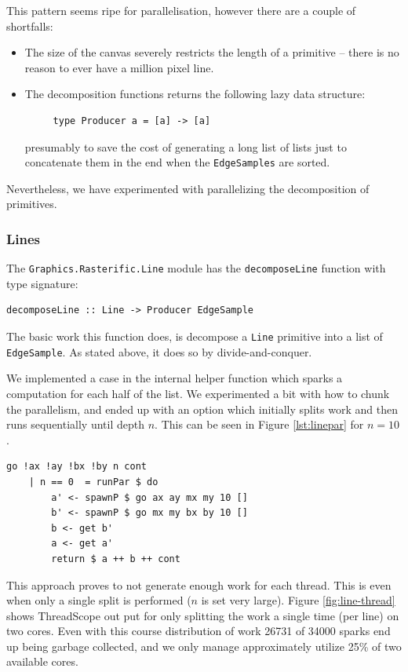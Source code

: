 \documentclass[12pt, a4paper]{article}
\begin{document}
This pattern seems ripe for parallelisation, however there are a couple of shortfalls:
\begin{itemize}
\item The size of the canvas severely restricts the length of a primitive -- there is no reason to ever
   have a million pixel line.
 \item The decomposition functions returns the following lazy data structure:
   \begin{lstlisting}
     type Producer a = [a] -> [a]\end{lstlisting}
   presumably to save the cost of generating a long list of lists just to concatenate them in the end
    when the \texttt{EdgeSamples} are sorted.
  \end{itemize}
  Nevertheless, we have experimented with parallelizing the decomposition of primitives.

\subsubsection{Lines}
The \texttt{Graphics.Rasterific.Line} module has the \texttt{decomposeLine} function with type
signature:
\begin{lstlisting}
decomposeLine :: Line -> Producer EdgeSample\end{lstlisting}
The basic work this function does, is decompose a \texttt{Line} primitive into a list of
\texttt{EdgeSample}. As stated above, it does so by divide-and-conquer.

We implemented a case in the internal helper function which sparks a computation for each half of the list.
We experimented a bit with how to chunk the parallelism, and ended up with an option which initially splits
 work and then runs sequentially until depth $n$. This can be seen in Figure \ref{lst:linepar} for $n=10$.
\begin{lstlisting}[caption={Naively splitting work in two parts every 10 levels of the recursion tree.}, label={lst:linepar}]
    go !ax !ay !bx !by n cont
    | n == 0  = runPar $ do
        a' <- spawnP $ go ax ay mx my 10 []
        b' <- spawnP $ go mx my bx by 10 []
        b <- get b'
        a <- get a'
        return $ a ++ b ++ cont
\end{lstlisting}
This approach proves to not generate enough work for each thread. This is even when only a single split
is performed ($n$ is set very large). Figure \ref{fig:line-thread} shows ThreadScope out put for only splitting the
work a single time (per line) on two cores. Even with this course distribution of work
26731 of 34000 sparks end up being garbage collected, and we only manage approximately utilize 25\% of two available
 cores.
\end{document}
